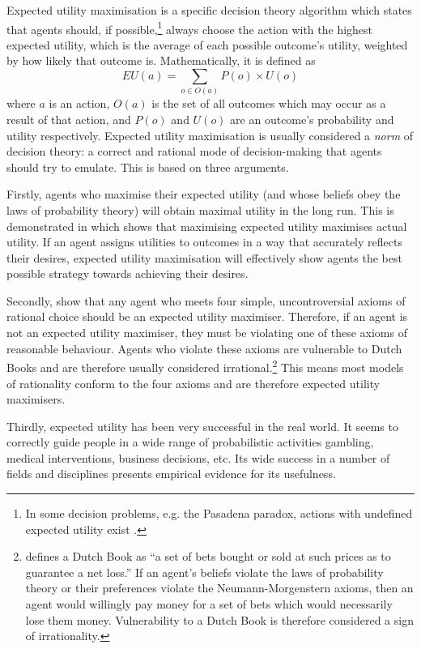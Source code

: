 \documentclass{article}
\begin{document}
Expected utility maximisation is a specific decision theory algorithm which states that agents should, if possible,\footnote{In some decision problems, e.g. the Pasadena paradox, actions with undefined expected utility exist \citep{nover2004vexing}.} always choose the action with the highest expected utility, which is the average of each possible outcome's utility, weighted by how likely that outcome is. Mathematically, it is defined as \[EU(a)=\sum_{o \in O(a)}P(o)\times U(o)\] where \(a\) is an action, \(O(a)\) is the set of all outcomes which may occur as a result of that action, and \(P(o)\) and \(U(o)\) are an outcome's probability and utility respectively. Expected utility maximisation is usually considered a \textit{norm} of decision theory: a correct and rational mode of decision-making that agents should try to emulate. This is based on three arguments.

Firstly, agents who maximise their expected utility (and whose beliefs obey the laws of probability theory) will obtain maximal utility in the long run. This is demonstrated in \citet{von1944games} which shows that maximising expected utility maximises actual utility. If an agent assigns utilities to outcomes in a way that accurately reflects their desires, expected utility maximisation will effectively show agents the best possible strategy towards achieving their desires. 

Secondly, \citet{von1944games} show that any agent who meets four simple, uncontroversial axioms of rational choice should be an expected utility maximiser. Therefore, if an agent is not an expected utility maximiser, they must be violating one of these axioms of reasonable behaviour. Agents who violate these axioms are vulnerable to Dutch Books and are therefore usually considered irrational.\footnote{\citet{hajek2008dutch} defines a Dutch Book as ``a set of bets bought or sold at such prices as to guarantee a net loss.'' If an agent's beliefs violate the laws of probability theory or their preferences violate the Neumann-Morgenstern axioms, then an agent would willingly pay money for a set of bets which would necessarily lose them money. Vulnerability to a Dutch Book is therefore considered a sign of irrationality.} This means most models of rationality conform to the four axioms and are therefore expected utility maximisers.

Thirdly, expected utility has been very successful in the real world. It seems to correctly guide people in a wide range of probabilistic activities \textemdash{} gambling, medical interventions, business decisions, etc. Its wide success in a number of fields and disciplines presents empirical evidence for its usefulness.
\end{document}
